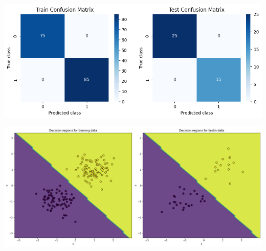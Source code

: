 \begin{qsolve}
	\begin{center}
		\includegraphics*[width=1\linewidth]{pics/img4.png}
		\label{ماتریس پراکندگی سوال ۱}
	\end{center}
	
	
	\begin{center}
		\includegraphics*[width=1\linewidth]{pics/img5.png}
		\label{ناحیه تصمیم سوال ۱}
	\end{center}

\end{qsolve}





